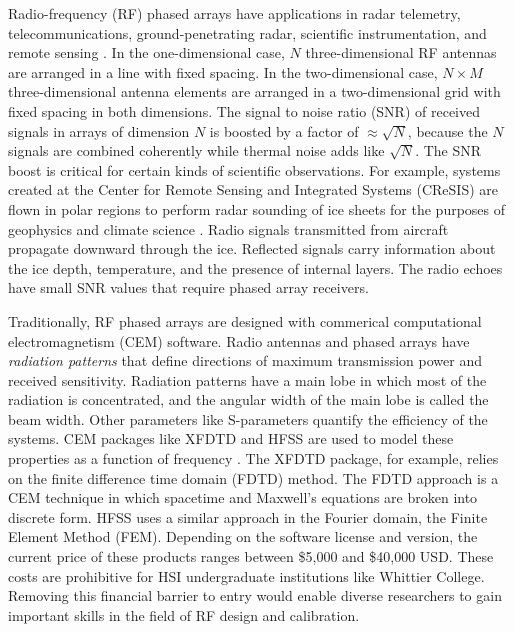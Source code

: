 \documentclass[../../main.tex]{subfiles}
\begin{document}
Radio-frequency (RF) phased arrays have applications in radar telemetry, telecommunications, ground-penetrating radar, scientific instrumentation, and remote sensing \cite{Vieregg_2016,AVVA201746,arnold_2020,PhysRevD.105.122006,10.3390/s21186091,10.1016/j.jappgeo.2022.104876,phased_array_book}.  In the one-dimensional case, $N$ three-dimensional RF antennas are arranged in a line with fixed spacing.  In the two-dimensional case, $N \times M$ three-dimensional antenna elements are arranged in a two-dimensional grid with fixed spacing in both dimensions.  The signal to noise ratio (SNR) of received signals in arrays of dimension $N$ is boosted by a factor of $\approx \sqrt{N}$, because the $N$ signals are combined coherently while thermal noise adds like $\sqrt{N}$.  The SNR boost is critical for certain kinds of scientific observations.  For example, systems created at the Center for Remote Sensing and Integrated Systems (CReSIS) are flown in polar regions to perform radar sounding of ice sheets for the purposes of geophysics and climate science \cite{arnold_2020}.  Radio signals transmitted from aircraft propagate downward through the ice.  Reflected signals carry information about the ice depth, temperature, and the presence of internal layers.  The radio echoes have small SNR values that require phased array receivers.  \\ \vspace{2.5mm}

Traditionally, RF phased arrays are designed with commerical computational electromagnetism (CEM) software.  Radio antennas and phased arrays have \textit{radiation patterns} that define directions of maximum transmission power and received sensitivity.  Radiation patterns have a main lobe in which most of the radiation is concentrated, and the angular width of the main lobe is called the beam width.  Other parameters like S-parameters quantify the efficiency of the systems.  CEM packages like XFDTD and HFSS are used to model these properties as a function of frequency \cite{remcom,ansys}.  The XFDTD package, for example, relies on the finite difference time domain (FDTD) method. The FDTD approach is a CEM technique in which spacetime and Maxwell’s equations are broken into discrete form.  HFSS uses a similar approach in the Fourier domain, the Finite Element Method (FEM).  Depending on the software license and version, the current price of these products ranges between \$5,000 and \$40,000 USD.  These costs are prohibitive for HSI undergraduate institutions like Whittier College.  Removing this financial barrier to entry would enable diverse researchers to gain important skills in the field of RF design and calibration. \\ \vspace{2.5mm}
\end{document}
